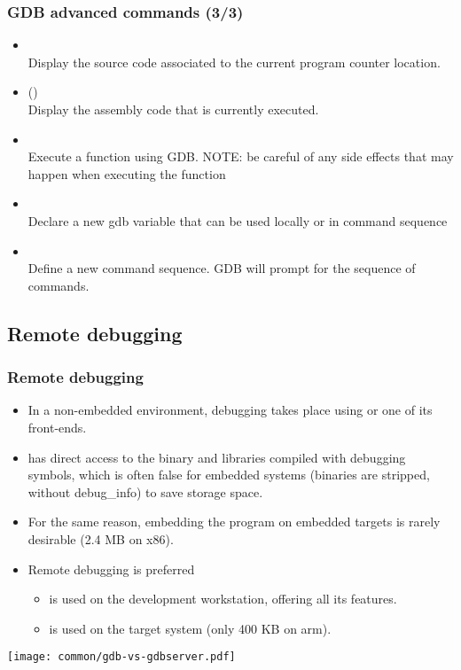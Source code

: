 {\begin{frame}
  \frametitle{GDB advanced commands (3/3)}
  \small
  \begin{itemize}
    \item {}\\
      Display the source code associated to the current program counter location.
    \item {} ()\\
      Display the assembly code that is currently executed.
    \item {}\\
      Execute a function using GDB. NOTE: be careful of any side effects that
      may happen when executing the function
    \item {}\\
      Declare a new gdb variable that can be used locally or in command sequence
    \item {}\\
      Define a new command sequence. GDB will prompt for the sequence of
      commands.
  \end{itemize}
\end{frame}
}
{
\subsection{Remote debugging}
}

\begin{frame}
  \frametitle{Remote debugging}
  \begin{itemize}
  \item In a non-embedded environment, debugging takes place using 
    or one of its front-ends.
  \item {} has direct access to the binary and libraries compiled
    with debugging symbols, which is often false for embedded systems
    (binaries are stripped, without debug\_info) to save storage space.
  \item For the same reason, embedding the  program on embedded
    targets is rarely desirable (2.4 MB on x86).
  \item Remote debugging is preferred
    \begin{itemize}
    \item {} is used on the development workstation, offering
      all its features.
    \item {} is used on the target system (only 400 KB
      on arm).
    \end{itemize}
  \end{itemize}
  \begin{center}
    \texttt{[image: common/gdb-vs-gdbserver.pdf]}
  \end{center}
\end{frame}


